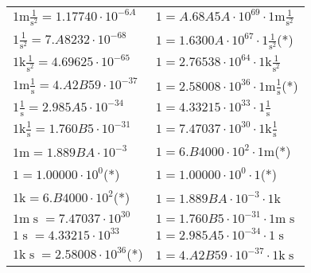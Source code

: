 \begin{center}
\begin{longtable}{l l}
{\color{gray}$1 \bm{\mathrm{ m}}{}\frac1{\operatorname{s}^2}{}{} = 1.17740\cdot10^{-6A} $}   & {\color{gray}$ 1 = A.68A5A\cdot10^{69} \cdot 1 \bm{\mathrm{ m}}{}\frac1{\operatorname{s}^2}{}{}$}  \\
{\color{black}$1 \bm{\mathrm{ }}{}\frac1{\operatorname{s}^2}{}{} = 7.A8232\cdot10^{-68} $}   & {\color{black}$ 1 = 1.6300A\cdot10^{67} \cdot 1 \bm{\mathrm{ }}{}\frac1{\operatorname{s}^2}{}{}$}\quad(*)\\
{\color{gray}$1 \bm{\mathrm{ k}}{}\frac1{\operatorname{s}^2}{}{} = 4.69625\cdot10^{-65} $}   & {\color{gray}$ 1 = 2.76538\cdot10^{64} \cdot 1 \bm{\mathrm{ k}}{}\frac1{\operatorname{s}^2}{}{}$}  \\
{\color{gray}$1 \bm{\mathrm{ m}}{}\frac1{\operatorname{s}}{}{} = 4.A2B59\cdot10^{-37} $}   & {\color{gray}$ 1 = 2.58008\cdot10^{36} \cdot 1 \bm{\mathrm{ m}}{}\frac1{\operatorname{s}}{}{}$}\quad(*)\\
{\color{black}$1 \bm{\mathrm{ }}{}\frac1{\operatorname{s}}{}{} = 2.985A5\cdot10^{-34} $}   & {\color{black}$ 1 = 4.33215\cdot10^{33} \cdot 1 \bm{\mathrm{ }}{}\frac1{\operatorname{s}}{}{}$}  \\
{\color{gray}$1 \bm{\mathrm{ k}}{}\frac1{\operatorname{s}}{}{} = 1.760B5\cdot10^{-31} $}   & {\color{gray}$ 1 = 7.47037\cdot10^{30} \cdot 1 \bm{\mathrm{ k}}{}\frac1{\operatorname{s}}{}{}$}  \\
{\color{gray}$1 \bm{\mathrm{ m}}{}{}{}{} = 1.889BA\cdot10^{-3} $}   & {\color{gray}$ 1 = 6.B4000\cdot10^{2} \cdot 1 \bm{\mathrm{ m}}{}{}{}{}$}\quad(*)\\
{\color{black}$1 \bm{\mathrm{ }}{}{}{}{} = 1.00000\cdot10^{0} $}\quad(*) & {\color{black}$ 1 = 1.00000\cdot10^{0} \cdot 1 \bm{\mathrm{ }}{}{}{}{}$}\quad(*)\\
{\color{gray}$1 \bm{\mathrm{ k}}{}{}{}{} = 6.B4000\cdot10^{2} $}\quad(*) & {\color{gray}$ 1 = 1.889BA\cdot10^{-3} \cdot 1 \bm{\mathrm{ k}}{}{}{}{}$}  \\
{\color{gray}$1 \bm{\mathrm{ m}}{}{\operatorname{s}}{}{} = 7.47037\cdot10^{30} $}   & {\color{gray}$ 1 = 1.760B5\cdot10^{-31} \cdot 1 \bm{\mathrm{ m}}{}{\operatorname{s}}{}{}$}  \\
{\color{black}$1 \bm{\mathrm{ }}{}{\operatorname{s}}{}{} = 4.33215\cdot10^{33} $}   & {\color{black}$ 1 = 2.985A5\cdot10^{-34} \cdot 1 \bm{\mathrm{ }}{}{\operatorname{s}}{}{}$}  \\
{\color{gray}$1 \bm{\mathrm{ k}}{}{\operatorname{s}}{}{} = 2.58008\cdot10^{36} $}\quad(*) & {\color{gray}$ 1 = 4.A2B59\cdot10^{-37} \cdot 1 \bm{\mathrm{ k}}{}{\operatorname{s}}{}{}$}  \\

\end{longtable}
\end{center}

